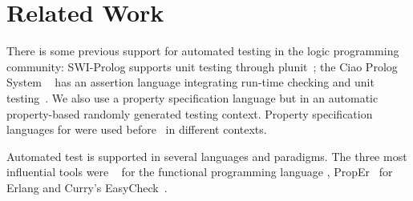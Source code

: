 
\section{Related Work} 
\label{sec:rel-work}


%
There is some previous support for automated testing in the logic programming
community:
%
{\sf SWI-Prolog} supports unit testing through {\sf plunit}~\cite{swi-prolog};
%
the {\sf Ciao Prolog System} ~\cite{ciao-prolog} has an assertion language
integrating run-time checking and unit testing~\cite{ciao-assert-unit}.
%
We also use a property specification language but in an
automatic property-based randomly generated testing context.
%
Property specification languages for \Prolog{} were used
before~\cite{ciao-assert-unit,Deville1990logprog,somogyi1995mercury} in
different contexts.


Automated test is supported in several languages and
paradigms.
%
The three most influential tools were \QuickCheck~\cite{quickcheck} for
the functional programming language \Haskell, {\sf PropEr}~\cite{papadakis2011proper} for %
{\sf Erlang}
and {\sf Curry}'s {\sf EasyCheck}~\cite{christiansen2008easycheck}.



